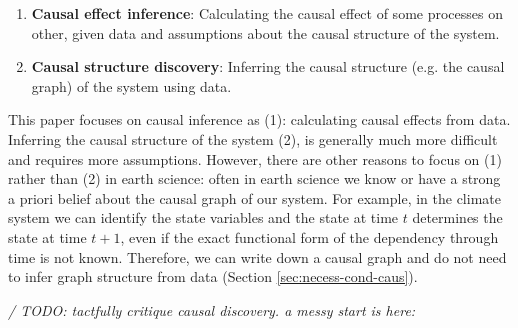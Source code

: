 \documentclass[12pt]{article}
\begin{document}
\begin{enumerate}
\item \textbf{Causal effect inference}: Calculating the causal effect
  of some processes on other, given data and assumptions about the
  causal structure of the system.
\item \textbf{Causal structure discovery}: Inferring the causal
  structure (e.g. the causal graph) of the system using data.
\end{enumerate}

This paper focuses on causal inference as (1): calculating causal
effects from data. Inferring the causal structure of the system (2),
is generally much more difficult and requires more
assumptions. However, there are other reasons to focus on (1) rather
than (2) in earth science: often in earth science we know or have a
strong a priori belief about the causal graph of our system. For
example, in the climate system we can identify the state variables and
the state at time \(t\) determines the state at time \(t+1\), even if
the exact functional form of the dependency through time is not
known. Therefore, we can write down a causal graph and do not need to
infer graph structure from data (Section \ref{sec:necess-cond-caus}).

\textit{/ TODO: tactfully critique causal discovery. a messy start is
  here:}
\end{document}

